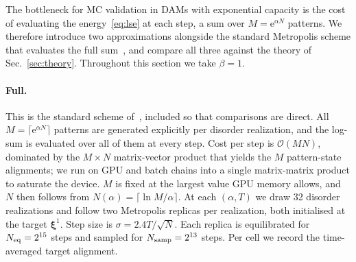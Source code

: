\documentclass[letterpaper]{article} %
\newcommand{\bxi}{\boldsymbol{\xi}}
\newcommand{\e}{{\mathrm{e}}}
\newcommand{\Bnet}{\beta}
\begin{document}
The bottleneck for MC validation in DAMs with exponential capacity is the cost of evaluating the energy~\eqref{eq:lse} at each step, a sum over $M = \e^{\alpha N}$ patterns. We therefore introduce two approximations alongside the standard Metropolis scheme that evaluates the full sum~\citep[e.g.,][]{iclr2026mc}, and compare all three against the theory of Sec.~\ref{sec:theory}. Throughout this section we take $\Bnet = 1$.

\paragraph{Full.} This is the standard scheme of~\citet{iclr2026mc}, included so that comparisons are direct. All $M = \lceil\e^{\alpha N}\rceil$ patterns are generated explicitly per disorder realization, and the log-sum is evaluated over all of them at every step. Cost per step is $\mathcal{O}(MN)$, dominated by the $M \times N$ matrix-vector product that yields the $M$ pattern-state alignments; we run on GPU and batch chains into a single matrix-matrix product to saturate the device. $M$ is fixed at the largest value GPU memory allows, and $N$ then follows from $N(\alpha) = \lceil \ln M / \alpha \rceil$. At each $(\alpha, T)$ we draw 32 disorder realizations and follow two Metropolis replicas per realization, both initialised at the target $\bxi^1$. Step size is $\sigma = 2.4 T / \sqrt N$. Each replica is equilibrated for $N_{\rm eq} = 2^{15}$ steps and sampled for $N_{\rm samp} = 2^{13}$ steps. Per cell we record the time-averaged target alignment.
\end{document}
